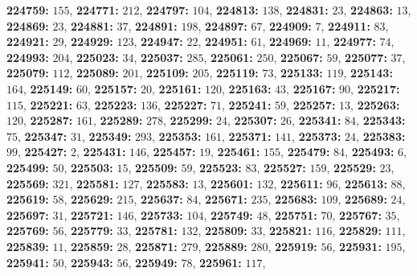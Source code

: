 \textsf{\bfseries 224759:} $155$, \textsf{\bfseries 224771:} $212$, \textsf{\bfseries 224797:} $104$, \textsf{\bfseries 224813:} $138$, \textsf{\bfseries 224831:} $23$, \textsf{\bfseries 224863:} $13$, \textsf{\bfseries 224869:} $23$, \textsf{\bfseries 224881:} $37$, \textsf{\bfseries 224891:} $198$, \textsf{\bfseries 224897:} $67$, \textsf{\bfseries 224909:} $7$, \textsf{\bfseries 224911:} $83$, \textsf{\bfseries 224921:} $29$, \textsf{\bfseries 224929:} $123$, \textsf{\bfseries 224947:} $22$, \textsf{\bfseries 224951:} $61$, \textsf{\bfseries 224969:} $11$, \textsf{\bfseries 224977:} $74$, \textsf{\bfseries 224993:} $204$, \textsf{\bfseries 225023:} $34$, \textsf{\bfseries 225037:} $285$, \textsf{\bfseries 225061:} $250$, \textsf{\bfseries 225067:} $59$, \textsf{\bfseries 225077:} $37$, \textsf{\bfseries 225079:} $112$, \textsf{\bfseries 225089:} $201$, \textsf{\bfseries 225109:} $205$, \textsf{\bfseries 225119:} $73$, \textsf{\bfseries 225133:} $119$, \textsf{\bfseries 225143:} $164$, \textsf{\bfseries 225149:} $60$, \textsf{\bfseries 225157:} $20$, \textsf{\bfseries 225161:} $120$, \textsf{\bfseries 225163:} $43$, \textsf{\bfseries 225167:} $90$, \textsf{\bfseries 225217:} $115$, \textsf{\bfseries 225221:} $63$, \textsf{\bfseries 225223:} $136$, \textsf{\bfseries 225227:} $71$, \textsf{\bfseries 225241:} $59$, \textsf{\bfseries 225257:} $13$, \textsf{\bfseries 225263:} $120$, \textsf{\bfseries 225287:} $161$, \textsf{\bfseries 225289:} $278$, \textsf{\bfseries 225299:} $24$, \textsf{\bfseries 225307:} $26$, \textsf{\bfseries 225341:} $84$, \textsf{\bfseries 225343:} $75$, \textsf{\bfseries 225347:} $31$, \textsf{\bfseries 225349:} $293$, \textsf{\bfseries 225353:} $161$, \textsf{\bfseries 225371:} $141$, \textsf{\bfseries 225373:} $24$, \textsf{\bfseries 225383:} $99$, \textsf{\bfseries 225427:} $2$, \textsf{\bfseries 225431:} $146$, \textsf{\bfseries 225457:} $19$, \textsf{\bfseries 225461:} $155$, \textsf{\bfseries 225479:} $84$, \textsf{\bfseries 225493:} $6$, \textsf{\bfseries 225499:} $50$, \textsf{\bfseries 225503:} $15$, \textsf{\bfseries 225509:} $59$, \textsf{\bfseries 225523:} $83$, \textsf{\bfseries 225527:} $159$, \textsf{\bfseries 225529:} $23$, \textsf{\bfseries 225569:} $321$, \textsf{\bfseries 225581:} $127$, \textsf{\bfseries 225583:} $13$, \textsf{\bfseries 225601:} $132$, \textsf{\bfseries 225611:} $96$, \textsf{\bfseries 225613:} $88$, \textsf{\bfseries 225619:} $58$, \textsf{\bfseries 225629:} $215$, \textsf{\bfseries 225637:} $84$, \textsf{\bfseries 225671:} $235$, \textsf{\bfseries 225683:} $109$, \textsf{\bfseries 225689:} $24$, \textsf{\bfseries 225697:} $31$, \textsf{\bfseries 225721:} $146$, \textsf{\bfseries 225733:} $104$, \textsf{\bfseries 225749:} $48$, \textsf{\bfseries 225751:} $70$, \textsf{\bfseries 225767:} $35$, \textsf{\bfseries 225769:} $56$, \textsf{\bfseries 225779:} $33$, \textsf{\bfseries 225781:} $132$, \textsf{\bfseries 225809:} $33$, \textsf{\bfseries 225821:} $116$, \textsf{\bfseries 225829:} $111$, \textsf{\bfseries 225839:} $11$, \textsf{\bfseries 225859:} $28$, \textsf{\bfseries 225871:} $279$, \textsf{\bfseries 225889:} $280$, \textsf{\bfseries 225919:} $56$, \textsf{\bfseries 225931:} $195$, \textsf{\bfseries 225941:} $50$, \textsf{\bfseries 225943:} $56$, \textsf{\bfseries 225949:} $78$, \textsf{\bfseries 225961:} $117$, 
